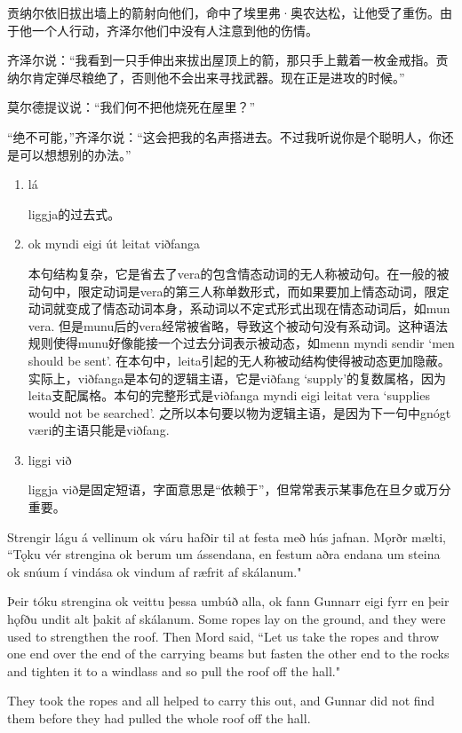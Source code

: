 \begin{translation*}{}
    贡纳尔依旧拔出墙上的箭射向他们，命中了埃里弗·奥农达松，让他受了重伤。由于他一个人行动，齐泽尔他们中没有人注意到他的伤情。

    齐泽尔说：“我看到一只手伸出来拔出屋顶上的箭，那只手上戴着一枚金戒指。贡纳尔肯定弹尽粮绝了，否则他不会出来寻找武器。现在正是进攻的时候。”

    莫尔德提议说：“我们何不把他烧死在屋里？”

    “绝不可能，”齐泽尔说：“这会把我的名声搭进去。不过我听说你是个聪明人，你还是可以想想别的办法。”
\end{translation*}
\begin{grammar*}{}
    \begin{enumerate}[leftmargin=*]
        \item lá

              liggja的过去式。
        \item ok myndi eigi út leitat viðfanga

              本句结构复杂，它是省去了vera的包含情态动词的无人称被动句。在一般的被动句中，限定动词是vera的第三人称单数形式，而如果要加上情态动词，限定动词就变成了情态动词本身，系动词以不定式形式出现在情态动词后，如mun vera. 但是munu后的vera经常被省略，导致这个被动句没有系动词。这种语法规则使得munu好像能接一个过去分词表示被动态，如menn myndi sendir `men should be sent'. 在本句中，leita引起的无人称被动结构使得被动态更加隐蔽。实际上，viðfanga是本句的逻辑主语，它是viðfang `supply'的复数属格，因为leita支配属格。本句的完整形式是viðfanga myndi eigi leitat vera `supplies would not be searched'. 之所以本句要以物为逻辑主语，是因为下一句中gnógt væri的主语只能是viðfang.

        \item liggi við

              liggja við是固定短语，字面意思是“依赖于”，但常常表示某事危在旦夕或万分重要。
    \end{enumerate}
\end{grammar*}
\begin{paracol}{2}
    Strengir lágu á vellinum ok váru hafðir til at festa með hús jafnan. Mǫrðr mælti, ``Tǫku vér strengina ok berum um ássendana, en festum aðra endana um steina ok snúum í vindása ok vindum af ræfrit af skálanum."

    Þeir tóku strengina ok veittu þessa umbúð alla, ok fann Gunnarr eigi fyrr en þeir hǫfðu undit alt þakit af skálanum.
    \switchcolumn
    Some ropes lay on the ground, and they were used to strengthen the roof. Then Mord said, ``Let us take the ropes and throw one end over the end of the carrying beams but fasten the other end to the rocks and tighten it to a windlass and so pull the roof off the hall."

    They took the ropes and all helped to carry this out, and Gunnar did not find them before they had pulled the whole roof off the hall.
\end{paracol}
